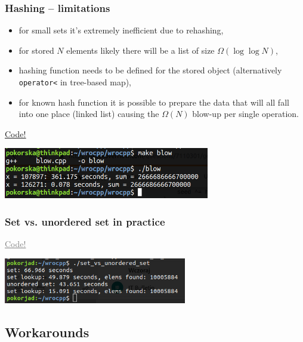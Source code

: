 \documentclass{beamer}
\begin{document}
\begin{frame}
    \frametitle{Hashing -- limitations}
    \pause
    \begin{itemize}
        \item for small sets it's extremely inefficient due to rehashing, \pause
        \item for stored $N$ elements likely there will be a list
            of size $\Omega(\log \log N)$, \pause
        \item hashing function needs to be defined for the stored object
            (alternatively \texttt{operator<} in tree-based map), \pause
        \item for known hash function it is possible to prepare the data
            that will all fall into one place (linked list) causing
            the $\Omega(N)$ blow-up per single operation. \pause
    \end{itemize}

    \textcolor{gray}{\href{https://github.com/gcc-mirror/gcc/blob/5bea0e90e58d971cf3e67f784a116d81a20b927a/libstdc\%2B\%2B-v3/src/shared/hashtable-aux.cc}
        {\underline{Code!}}} \pause

    \begin{center}
    \includegraphics[width=9cm]{blow.png}
    \end{center}
\end{frame}

\begin{frame}
    \frametitle{Set vs. unordered set in practice}

    \textcolor{gray}{\underline{Code!}} \pause

    \centering
    \includegraphics[width=8cm]{set_vs_uset.png}
\end{frame}

\subsection{Workarounds}
\end{document}
